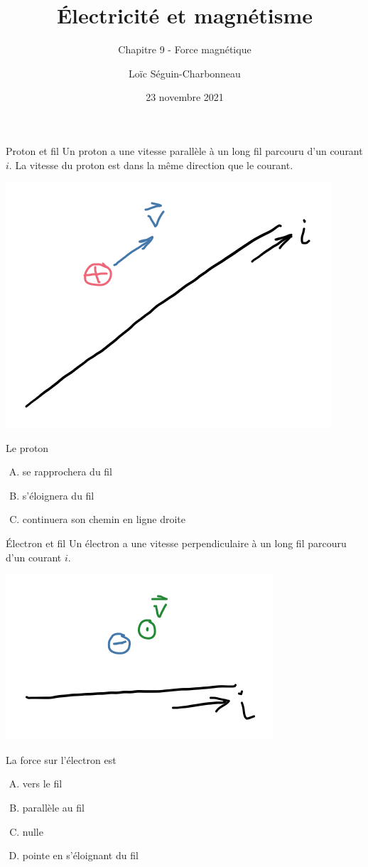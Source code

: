 \documentclass{beamer}
\title{Électricité et magnétisme}
\subtitle{Chapitre 9 - Force magnétique}
\date{23 novembre 2021}
\author{Loïc Séguin-Charbonneau}
\institute{Cégep Édouard-Montpetit}
\begin{document}
\maketitle

\begin{frame}{Proton et fil}
  Un proton a une vitesse parallèle à un long fil parcouru d'un courant $i$. La
  vitesse du proton est dans la même direction que le courant.
    \begin{center}
      \includegraphics[scale=0.3]{figures/proton_fil.png}
    \end{center}
  Le proton 
  \begin{enumerate}[A.]
    \item<alert@2> se rapprochera du fil
    \item s'éloignera du fil
    \item continuera son chemin en ligne droite
  \end{enumerate}
\end{frame}


\begin{frame}{Électron et fil}
  Un électron a une vitesse perpendiculaire à un long fil parcouru d'un courant
  $i$.
  \begin{center}
    \includegraphics[scale=0.3]{figures/electron_fil.png}
  \end{center}
  La force sur l'électron est 
  \begin{enumerate}[A.]
    \item vers le fil
    \item parallèle au fil
    \item<alert@2> nulle
    \item pointe en s'éloignant du fil
  \end{enumerate}
\end{frame}
\end{document}
